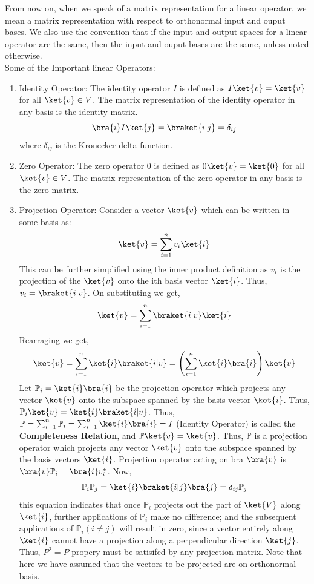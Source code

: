 \documentclass[12pt, oneside]{book}
\theoremstyle{definition}
\theoremstyle{definition}
\theoremstyle{remark}
\begin{document}
From now on, when we speak of a matrix representation for a linear operator, we mean a matrix representation with respect
to orthonormal input and ouput bases. We also use the convention that if the input and output spaces for a linear operator are the same,
then the input and ouput bases are the same, unless noted otherwise.
\\
Some of the Important linear Operators: 
\begin{enumerate}
    \item Identity Operator: The identity operator $I$ is defined as $I\ket{v}=\ket{v}$ for all $\ket{v}\in V$. The matrix representation of the identity operator in any basis is the identity matrix.
    \[\bra{i}I\ket{j}=\braket{i|j}=\delta_{ij}\] 
    where $\delta_{ij}$ is the Kronecker delta function.
    \item Zero Operator: The zero operator $0$ is defined as $0\ket{v}=\ket{0}$ for all $\ket{v}\in V$. The matrix representation of the zero operator in any basis is the zero matrix.
    \item Projection Operator: Consider a vector $\ket{v}$ which can be written in some basis as:
    \[ \ket{v}=\sum_{i=1}^{n}v_i\ket{i} \]
    This can be further simplified using the inner product definition as $v_i$ is the projection of the $\ket{v}$ onto the ith basis vector $\ket{i}$.
    Thus, $v_i=\braket{i|v}$. On substituting we get,
    \[ \ket{v}=\sum_{i=1}^{n}\braket{i|v}\ket{i} \]
    Rearraging we get,
    \[ \ket{v}=\sum_{i=1}^{n}\ket{i}\braket{i|v} =\left(\sum_{i=1}^n \ket{i}\bra{i} \right) \ket{v}\]
    Let $\mathbb{P}_i = \ket{i}\bra{i}$ be the projection operator which projects any vector $\ket{v}$ onto the subspace spanned by the basis vector $\ket{i}$.
    Thus, $\mathbb{P}_i\ket{v}=\ket{i}\braket{i|v}$. Thus, $\mathbb{P}=\sum_{i=1}^n \mathbb{P}_i = \sum_{i=1}^n \ket{i}\bra{i} = I$ (Identity Operator) is called the \textbf{Completeness Relation}, and $\mathbb{P}\ket{v}=\ket{v}$. Thus, $\mathbb{P}$ is a projection operator which projects any vector $\ket{v}$ 
    onto the subspace spanned by the basis vectors $\ket{i}$. Projection operator acting on bra $\bra{v}$ is 
    $\bra{v}\mathbb{P}_i=\bra{i}v_i^*$.
    Now, 
    \[\mathbb{P}_i\mathbb{P}_j=\ket{i}\braket{i|j}\bra{j}=\delta_{ij}\mathbb{P}_j\]
    this equation indicates that once $\mathbb{P}_i$ projects out the part of $\ket{V}$ along $\ket{i}$, further applications
    of $\mathbb{P}_i$ make no difference; and the subsequent applications of $\mathbb{P}_i (i \neq j)$ will result in zero, since 
    a vector entirely along $\ket{i}$ cannot have a projection along a perpendicular direction $\ket{j}$. Thus, $P^2=P$ propery must be satisifed by any projection matrix. Note that here we have assumed that the vectors to be projected
    are on orthonormal basis.


\end{enumerate}
\end{document}
